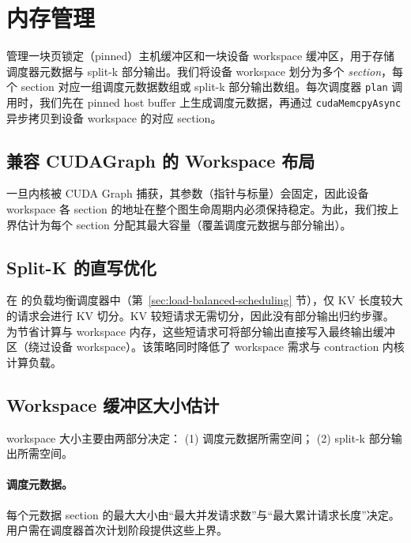 \section{内存管理}
\label{sec:memory-mgmt}

\sys 管理一块页锁定（pinned）主机缓冲区和一块设备 workspace 缓冲区，用于存储调度器元数据与 split-k 部分输出。我们将设备 workspace 划分为多个 \emph{section}，每个 section 对应一组调度元数据数组或 split-k 部分输出数组。每次调度器 \lstinline{plan} 调用时，我们先在 pinned host buffer 上生成调度元数据，再通过 \lstinline{cudaMemcpyAsync} 异步拷贝到设备 workspace 的对应 section。

\subsection{兼容 CUDAGraph 的 Workspace 布局}
\label{sec:cudagraph-compatible-layout}

一旦内核被 CUDA Graph 捕获，其参数（指针与标量）会固定，因此设备 workspace 各 section 的地址在整个图生命周期内必须保持稳定。为此，我们按上界估计为每个 section 分配其最大容量（覆盖调度元数据与部分输出）。

\subsection{Split-K 的直写优化}
\label{sec:writethrough-optimizations}

在 \sys 的负载均衡调度器中（第~\ref{sec:load-balanced-scheduling} 节），仅 KV 长度较大的请求会进行 KV 切分。KV 较短请求无需切分，因此没有部分输出归约步骤。为节省计算与 workspace 内存，这些短请求可将部分输出直接写入最终输出缓冲区（绕过设备 workspace）。该策略同时降低了 workspace 需求与 contraction 内核计算负载。

\subsection{Workspace 缓冲区大小估计}
\label{sec:workspace-buffer-size}

workspace 大小主要由两部分决定：
(1) 调度元数据所需空间；
(2) split-k 部分输出所需空间。

\paragraph{调度元数据。} 每个元数据 section 的最大大小由“最大并发请求数”与“最大累计请求长度”决定。用户需在调度器首次计划阶段提供这些上界。

